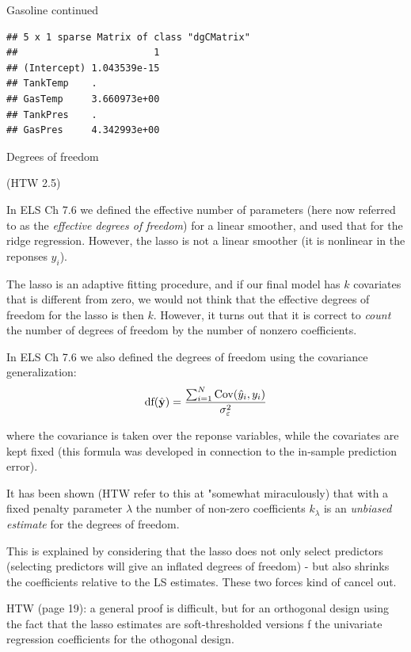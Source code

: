 \documentclass[
  ignorenonframetext,
]{beamer}
\begin{document}
\begin{frame}[fragile]
\begin{block}{Gasoline continued}
\begin{verbatim}
## 5 x 1 sparse Matrix of class "dgCMatrix"
##                        1
## (Intercept) 1.043539e-15
## TankTemp    .           
## GasTemp     3.660973e+00
## TankPres    .           
## GasPres     4.342993e+00
\end{verbatim}

\end{block}

\end{frame}

\begin{frame}

\begin{block}{Degrees of freedom}

(HTW 2.5)

In ELS Ch 7.6 we defined the effective number of parameters (here now
referred to as the \emph{effective degrees of freedom}) for a linear
smoother, and used that for the ridge regression. However, the lasso is
not a linear smoother (it is nonlinear in the reponses \(y_i\)).

The lasso is an adaptive fitting procedure, and if our final model has
\(k\) covariates that is different from zero, we would not think that
the effective degrees of freedom for the lasso is then \(k\). However,
it turns out that it is correct to \emph{count} the number of degrees of
freedom by the number of nonzero coefficients.

In ELS Ch 7.6 we also defined the degrees of freedom using the
covariance generalization:
\[\text{df}(\hat{{\bf y}})=\frac{\sum_{i=1}^N \text{Cov}(\hat{y}_i,y_i)}{\sigma_{\varepsilon}^2}\]

where the covariance is taken over the reponse variables, while the
covariates are kept fixed (this formula was developed in connection to
the in-sample prediction error).

\end{block}

\end{frame}

\begin{frame}

It has been shown (HTW refer to this at "somewhat miraculously) that
with a fixed penalty parameter \(\lambda\) the number of non-zero
coefficients \(k_{\lambda}\) is an \emph{unbiased estimate} for the
degrees of freedom.

This is explained by considering that the lasso does not only select
predictors (selecting predictors will give an inflated degrees of
freedom) - but also shrinks the coefficients relative to the LS
estimates. These two forces kind of cancel out.

HTW (page 19): a general proof is difficult, but for an orthogonal
design using the fact that the lasso estimates are soft-thresholded
versions f the univariate regression coefficients for the othogonal
design.

\end{frame}
\end{document}
